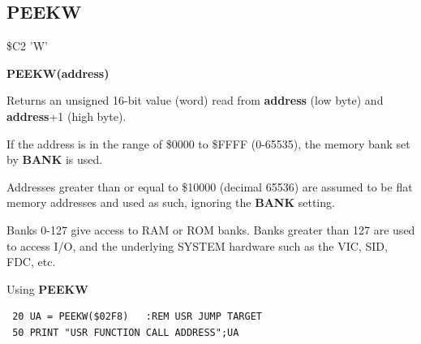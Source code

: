 \subsection{PEEKW}
\begin{description}[leftmargin=2cm,style=nextline]
\item [Token:] \$C2 'W'
\item [Format:] {\bf PEEKW(address)}
\item [Usage:]  Returns an unsigned 16-bit value (word)
                read from {\bf address} (low byte) and {\bf address}+1 (high byte).

                If the address is in the range of \$0000 to \$FFFF (0-65535), the
                memory bank set by {\bf BANK} is used.

                Addresses greater than or equal to \$10000 (decimal 65536) are assumed to be flat memory
                addresses and used as such, ignoring the {\bf BANK} setting.


\item [Remarks:] Banks 0-127 give access to RAM or ROM banks.
                 Banks greater than 127 are used to access I/O, and the underlying SYSTEM hardware such as the
                 VIC, SID, FDC, etc.
\item [Example:] Using {\bf PEEKW}

\begin{tcolorbox}[colback=black,coltext=white]
\verbatimfont{\codefont}
\begin{verbatim}
 20 UA = PEEKW($02F8)   :REM USR JUMP TARGET
 50 PRINT "USR FUNCTION CALL ADDRESS";UA
\end{verbatim}
\end{tcolorbox}
\end{description}


\newpage
